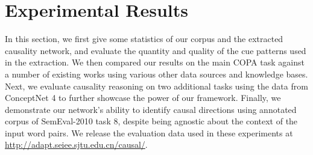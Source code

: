 \documentclass[letterpaper]{article}
\begin{document}
% 
\section{Experimental Results}
\label{sec:eval}
In this section, we first give some statistics of
our corpus and the extracted causality network, and evaluate the
quantity and quality of the cue patterns used in the extraction.
We then compared our results on the main COPA task against a number of
existing works using various other data sources and knowledge bases.
Next, we evaluate causality reasoning
on two additional tasks using the data from ConceptNet 4 to
further showcase the power of our framework.
Finally, we demonstrate our network's ability to identify causal directions
using annotated corpus of SemEval-2010 task 8, despite being
agnostic about the context of the input word pairs.
We release the evaluation data used in these experiments
at \url{http://adapt.seiee.sjtu.edu.cn/causal/}. 
\end{document}
